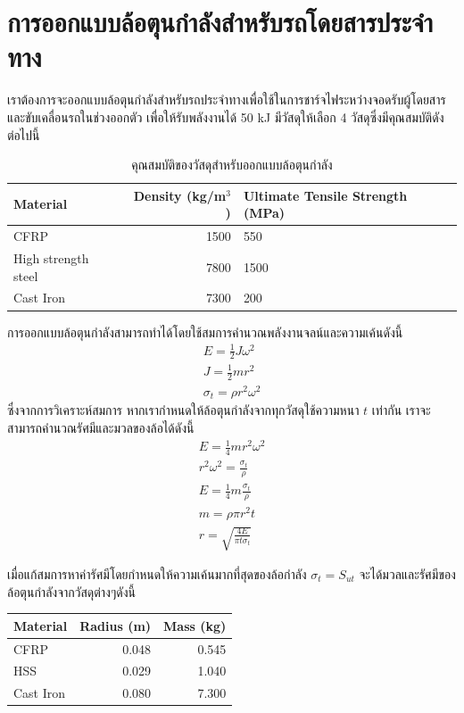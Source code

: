 \documentclass[a4paper,nobib,openany]{tufte-book}
\begin{document}
\section{การออกแบบล้อตุนกำลังสำหรับรถโดยสารประจำทาง}
\label{sec:org5c6d051}

เราต้องการจะออกแบบล้อตุนกำลังสำหรับรถประจำทางเพื่อใช้ในการชาร์จไฟระหว่างจอดรับผู้โดยสาร
และขับเคลื่อนรถในช่วงออกตัว เพื่อให้รับพลังงานได้ 50 kJ มีวัสดุให้เลือก
4 วัสดุซึ่งมีคุณสมบัติดังต่อไปนี้

\begin{table}[htbp]
\caption{คุณสมบัติของวัสดุสำหรับออกแบบล้อตุนกำลัง}
\centering
\begin{tabular}{lrp{3cm}}
\toprule
Material & Density (kg/m\(^{\text{3}}\)) & Ultimate Tensile Strength (MPa)\\
\midrule
CFRP & 1500 & 550\\
High strength steel & 7800 & 1500\\
Cast Iron & 7300 & 200\\
\bottomrule
\end{tabular}
\end{table}

การออกแบบล้อตุนกำลังสามารถทำได้โดยใช้สมการคำนวณพลังงานจลน์และความเค้นดังนี้
\[\begin{gathered}
    E = \frac{1}{2} J \omega^2 \\
    J = \frac{1}{2} m r^2 \\
    \sigma_t = \rho r^2 \omega^2
  \end{gathered}\] ซึ่งจากการวิเคราะห์สมการ
หากเรากำหนดให้ล้อตุนกำลังจากทุกวัสดุใช้ความหนา \(t\) เท่ากัน
เราจะสามารถคำนวณรัศมีและมวลของล้อได้ดังนี้ \[\begin{gathered}
    E = \frac{1}{4} m r^2 \omega^2 \\
    r^2 \omega^2 = \frac{\sigma_t}{\rho} \\
    E = \frac{1}{4} m \frac{\sigma_t}{\rho} \\
    m = \rho \pi r^2 t \\
    r = \sqrt{ \frac{4E}{\pi t \sigma_t}}
  \end{gathered}\]

เมื่อแก้สมการหาค่ารัศมีโดยกำหนดให้ความเค้นมากที่สุดของล้อกำลัง
\(\sigma_t = S_{ut}\) จะได้มวลและรัศมีของล้อตุนกำลังจากวัสดุต่างๆดังนี้

\begin{center}
\begin{tabular}{lrr}
\toprule
Material & Radius (m) & Mass (kg)\\
\midrule
CFRP & 0.048 & 0.545\\
HSS & 0.029 & 1.040\\
Cast Iron & 0.080 & 7.300\\
\bottomrule
\end{tabular}
\end{center}
\end{document}
